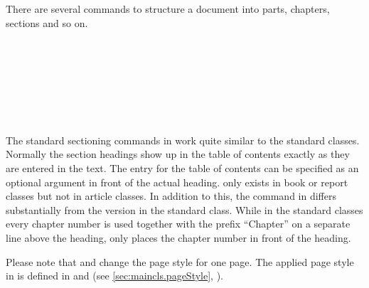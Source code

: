 There are several commands to structure a document into parts, chapters,
sections and so on.

\begin{Declaration}
  \\
  \\
  \\
  \\
  \\
  \\
\end{Declaration}%
%
%
%
%
%
%
%
The standard sectioning commands in {\KOMAScript} work quite similar
to the standard classes. Normally the section headings show up in the
table of contents exactly as they are entered in the text. The entry
for the table of contents can be specified as an optional argument in
front of the actual heading.
 only exists in book or
report classes but not in article classes. In addition to this, the
command  in {\KOMAScript} differs substantially from
the version in the standard class. While in the standard classes every
chapter number is used together with the prefix ``Chapter'' on a
separate line above the heading, {\KOMAScript} only places the chapter
number in front of the heading.

Please note that  and  change the page
style for one page. The applied page style in \KOMAScript{} is defined
in  and  (see
\autoref{sec:maincls.pageStyle},
).

